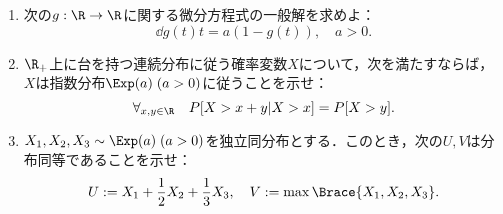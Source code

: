\documentclass[uplatex,dvipdfmx]{jsarticle}
\begin{document}
\begin{tcolorbox}[colframe=ForestGreen, colback=ForestGreen!10!white,breakable,colbacktitle=ForestGreen!40!white,coltitle=black,fonttitle=\bfseries\sffamily,
    title=第４問]
    \begin{problem}\mbox{}\label{prob-21-1-4-Exp}
        \begin{enumerate}
            \item 次の$g:\R\to\R$に関する微分方程式の一般解を求めよ：
            \[\dd{g(t)}{t}=a(1-g(t)),\quad a>0.\]
            \item $\R_+$上に台を持つ連続分布に従う確率変数$X$について，次を満たすならば，$X$は指数分布$\Exp(a)\;(a>0)$に従うことを示せ：
            \[\forall_{x,y\in\R}\quad P[X>x+y|X>x]=P[X>y].\]
            \item $X_1,X_2,X_3\sim\Exp(a)\;(a>0)$を独立同分布とする．このとき，次の$U,V$は分布同等であることを示せ：
            \[U:=X_1+\frac{1}{2}X_2+\frac{1}{3}X_3,\quad V:=\max\Brace{X_1,X_2,X_3}.\]
        \end{enumerate}
    \end{problem}
\end{tcolorbox}
\end{document}
